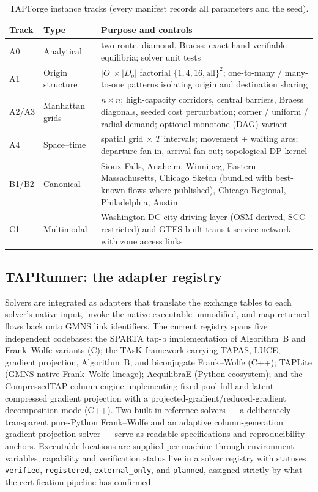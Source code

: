 \documentclass[11pt]{article}
\begin{document}
\begin{table}[h]
\centering\small
\caption{TAPForge instance tracks (every manifest records all parameters
and the seed).}
\label{tab:tracks}
\begin{tabular}{llp{8.6cm}}
\toprule
Track & Type & Purpose and controls \\
\midrule
A0 & Analytical & two-route, diamond, Braess: exact hand-verifiable
equilibria; solver unit tests \\
A1 & Origin structure & $|O|\times|D_o|$ factorial
$\{1,4,16,\mathrm{all}\}^2$; one-to-many / many-to-one patterns isolating
origin and destination sharing \\
A2/A3 & Manhattan grids & $n\times n$; high-capacity corridors, central
barriers, Braess diagonals, seeded cost perturbation; corner / uniform /
radial demand; optional monotone (DAG) variant \\
A4 & Space--time & spatial grid $\times$ $T$ intervals; movement + waiting
arcs; departure fan-in, arrival fan-out; topological-DP kernel \\
B1/B2 & Canonical & Sioux Falls, Anaheim, Winnipeg, Eastern Massachusetts,
Chicago Sketch (bundled with best-known flows where published), Chicago
Regional, Philadelphia, Austin \\
C1 & Multimodal & Washington DC city driving layer (OSM-derived,
SCC-restricted) and GTFS-built transit service network with zone access
links \\
\bottomrule
\end{tabular}
\end{table}

\subsection{TAPRunner: the adapter registry}
Solvers are integrated as adapters that translate the exchange tables to
each solver's native input, invoke the native executable unmodified, and
map returned flows back onto GMNS link identifiers. The current registry
spans five independent codebases: the SPARTA tap-b implementation of
Algorithm~B and Frank--Wolfe variants (C); the TAsK framework carrying
TAPAS, LUCE, gradient projection, Algorithm~B, and biconjugate
Frank--Wolfe (C++); TAPLite (GMNS-native Frank--Wolfe lineage);
AequilibraE (Python ecosystem); and the CompressedTAP column engine
implementing fixed-pool full and latent-compressed gradient projection with
a projected-gradient/reduced-gradient decomposition mode (C++). Two
built-in reference solvers --- a deliberately transparent pure-Python
Frank--Wolfe and an adaptive column-generation gradient-projection solver
--- serve as readable specifications and reproducibility anchors.
Executable locations are supplied per machine through environment
variables; capability and verification status live in a solver registry
with statuses \texttt{verified}, \texttt{registered},
\texttt{external\_only}, and \texttt{planned}, assigned strictly by what
the certification pipeline has confirmed.
\end{document}
